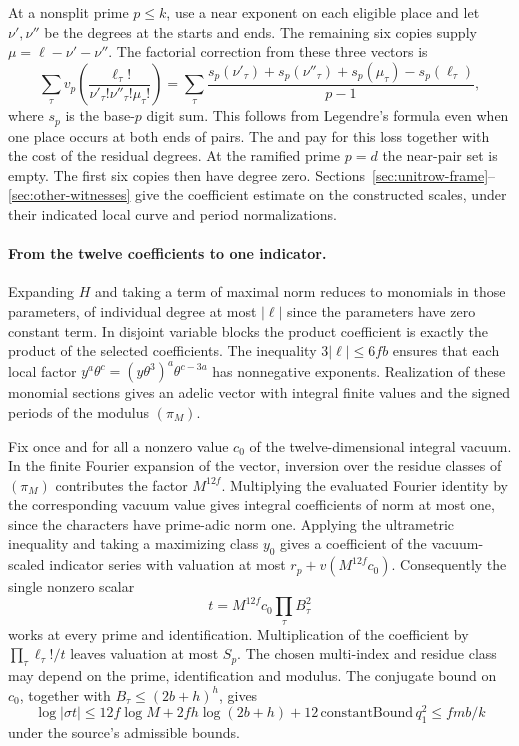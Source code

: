 At a nonsplit prime \(p\le k\), use a near exponent on each eligible
place and let \(\nu',\nu''\) be the degrees at the starts and ends.
The remaining six copies supply \(\mu=\ell-\nu'-\nu''\).
The factorial correction from these three vectors is
\[
 \sum_\tau v_p\!\left(\frac{\ell_\tau!}{\nu'_\tau!\nu''_\tau!\mu_\tau!}\right)
 =\sum_\tau
 \frac{s_p(\nu'_\tau)+s_p(\nu''_\tau)+s_p(\mu_\tau)-s_p(\ell_\tau)}{p-1},
\]
where \(s_p\) is the base-\(p\) digit sum. This follows from Legendre's
formula even when one place occurs at both ends of pairs. The
 and
pay for this loss together with the cost of the residual degrees.
At the ramified prime \(p=d\) the near-pair set is empty. The first six
copies then have degree zero. Sections~\ref{sec:unitrow-frame}--\ref{sec:other-witnesses} give the coefficient estimate on the constructed scales, under their indicated local curve and period normalizations.

\paragraph{From the twelve coefficients to one indicator.}
Expanding $H$ and taking a term of maximal norm reduces to monomials in those parameters, of individual degree at most $|\ell|$ since the parameters have zero constant term. In disjoint variable blocks the product coefficient is exactly the product of the selected coefficients. The inequality $3|\ell|\le6fb$ ensures that each local factor $y^a\theta^c=(y\theta^3)^a\theta^{c-3a}$ has nonnegative exponents. Realization of these monomial sections gives an adelic vector with integral finite values and the signed periods of the modulus $(\pi_M)$.

Fix once and for all a nonzero value $c_0$ of the twelve-dimensional integral vacuum. In the finite Fourier expansion of the vector, inversion over the residue classes of $(\pi_M)$ contributes the factor $M^{12f}$. Multiplying the evaluated Fourier identity by the corresponding vacuum value gives integral coefficients of norm at most one, since the characters have prime-adic norm one. Applying the ultrametric inequality and taking a maximizing class $y_0$ gives a coefficient of the vacuum-scaled indicator series with valuation at most $r_p+v(M^{12f}c_0)$. Consequently the single nonzero scalar
\[
 t=M^{12f}c_0\prod_\tau B_\tau^2
\]
works at every prime and identification. Multiplication of the coefficient by $\prod_\tau\ell_\tau!/t$ leaves valuation at most $S_p$. The chosen multi-index and residue class may depend on the prime, identification and modulus. The conjugate bound on $c_0$, together with $B_\tau\le(2b+h)^h$, gives
\[
 \log|\sigma t|\le12f\log M+2fh\log(2b+h)
             +12\,\mathrm{constantBound}\,q_1^2\le fmb/k
\]
under the source's admissible bounds.

